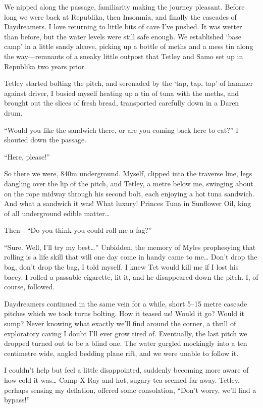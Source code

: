 We nipped along the passage, familiarity making the journey pleasant.
Before long we were back at Republika, then Insomnia, and finally the
cascades of Daydreamers. I love returning to little bits of cave I've
pushed. It was wetter than before, but the water levels were still safe
enough. We established `base camp' in a little sandy alcove, picking up
a bottle of meths and a mess tin along the way---remnants of a sneaky
little outpost that Tetley and Samo set up in Republika two years prior.

Tetley started bolting the pitch, and serenaded by the `tap, tap, tap'
of hammer against driver, I busied myself heating up a tin of tuna with
the meths, and brought out the slices of fresh bread, transported
carefully down in a Daren drum.

``Would you like the sandwich there, or are you coming back here to
eat?'' I shouted down the passage.

``Here, please!''

So there we were, 840m underground. Myself, clipped into the traverse
line, legs dangling over the lip of the pitch, and Tetley, a metre below
me, swinging about on the rope midway through his second bolt, each
enjoying a hot tuna sandwich. And what a sandwich it was! What luxury!
Princes Tuna in Sunflower Oil, king of all underground edible
matter\ldots{}

Then---``Do you think you could roll me a fag?''

``Sure. Well, I'll try my best\ldots{}'' Unbidden, the memory of Myles
prophesying that rolling is a life skill that will one day come in handy
came to me\ldots{} Don't drop the bag, don't drop the bag, I told
myself. I knew Tet would kill me if I lost his baccy. I rolled a
passable cigarette, lit it, and he disappeared down the pitch. I, of
course, followed.

Daydreamers continued in the same vein for a while, short 5--15 metre
cascade pitches which we took turns bolting. How it teased us! Would it
go? Would it sump? Never knowing what exactly we'll find around the
corner, a thrill of exploratory caving I doubt I'll ever grow tired of.
Eventually, the last pitch we dropped turned out to be a blind one. The
water gurgled mockingly into a ten centimetre wide, angled bedding plane
rift, and we were unable to follow it.

I couldn't help but feel a little disappointed, suddenly becoming more
aware of how cold it was\ldots{} Camp X-Ray and hot, sugary tea seemed
far away. Tetley, perhaps sensing my deflation, offered some
consolation, ``Don't worry, we'll find a bypass!''

